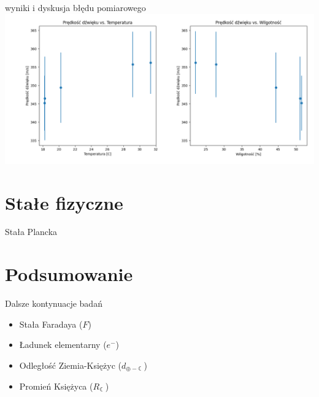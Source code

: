 \documentclass{beamer}
\begin{document}
\begin{frame}{wyniki i dyskusja błędu pomiarowego}
\includegraphics[width=\linewidth]{temp_humid_mach.png}

\end{frame}


\section{Stałe fizyczne}

\begin{frame}{Stała Plancka}

\end{frame}


\section{Podsumowanie}

\begin{frame}{Dalsze kontynuacje badań}
\begin{itemize}
\item Stała Faradaya ($F$)
\item Ładunek elementarny ($e^-$)
\item Odległość Ziemia-Księżyc ($d_{\oplus - \leftmoon}$)
\item Promień Księżyca ($R_{\leftmoon}$)
\end{itemize}

\end{frame}
\end{document}

